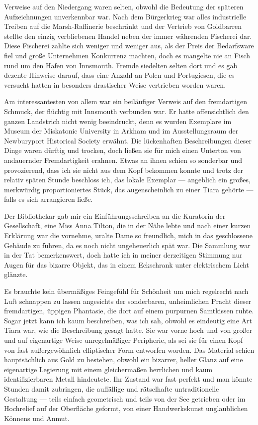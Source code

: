 Verweise auf den Niedergang waren selten, obwohl die Bedeutung der späteren Aufzeichnungen unverkennbar war. Nach dem Bürgerkrieg war alles industrielle Treiben auf die Marsh-Raffinerie beschränkt und der Vertrieb von Goldbarren stellte den einzig verbliebenen Handel neben der immer währenden Fischerei dar. Diese Fischerei zahlte sich weniger und weniger aus, als der Preis der Bedarfsware fiel und große Unternehmen Konkurrenz machten, doch es mangelte nie an Fisch rund um den Hafen von Innsmouth. Fremde siedelten selten dort und es gab dezente Hinweise darauf, dass eine Anzahl an Polen und Portugiesen, die es versucht hatten in besonders drastischer Weise vertrieben worden waren.

Am interessantesten von allem war ein beiläufiger Verweis auf den fremdartigen Schmuck,  der flüchtig mit Innsmouth verbunden war. Er hatte offensichtlich den ganzen Landstrich nicht wenig beeindruckt,  denn es wurden Exemplare im Museum der Miskatonic University in Arkham und im Ausstellungsraum der Newburyport Historical Society erwähnt. Die lückenhaften Beschreibungen dieser Dinge waren dürftig und trocken,  doch ließen sie für mich einen Unterton von andauernder Fremdartigkeit erahnen. Etwas an ihnen schien so sonderbar und provozierend, dass ich sie nicht aus dem Kopf bekommen konnte und trotz der relativ späten Stunde beschloss ich, das lokale Exemplar --- angeblich ein großes, merkwürdig proportioniertes Stück, das augenscheinlich zu einer Tiara gehörte --- falls es sich arrangieren ließe.

Der Bibliothekar gab mir ein Einführungsschreiben an die Kuratorin der Gesellschaft, eine Miss Anna Tilton, die in der Nähe lebte und nach einer kurzen Erklärung war die vornehme, uralte Dame so freundlich, mich in das geschlossene Gebäude zu führen, da es noch nicht ungeheuerlich spät war. Die Sammlung war in der Tat bemerkenswert, doch hatte ich in meiner derzeitigen Stimmung nur Augen für das bizarre Objekt, das in einem Eckschrank unter elektrischem Licht glänzte.

Es brauchte kein übermäßiges Feingefühl für Schönheit um mich regelrecht nach Luft schnappen zu lassen angesichts der sonderbaren, unheimlichen Pracht dieser fremdartigen, üppigen Phantasie, die dort auf einem purpurnen Samtkissen ruhte. Sogar jetzt kann ich kaum beschreiben, was ich sah, obwohl es eindeutig eine Art Tiara war, wie die Beschreibung gesagt hatte. Sie war vorne hoch und von großer und auf eigenartige Weise unregelmäßiger Peripherie, als sei sie für einen Kopf von fast außergewöhnlich elliptischer Form entworfen worden. Das Material schien hauptsächlich aus Gold zu bestehen, obwohl ein bizarrer, heller Glanz auf eine eigenartige Legierung mit einem gleichermaßen herrlichen und kaum identifizierbaren Metall hindeutete. Ihr Zustand war fast perfekt und man könnte Stunden damit zubringen, die auffällige und rätselhafte untraditionelle Gestaltung --- teils einfach geometrisch und teils von der See getrieben oder im Hochrelief auf der Oberfläche geformt, von einer Handwerkskunst unglaublichen Könnens und Anmut.


